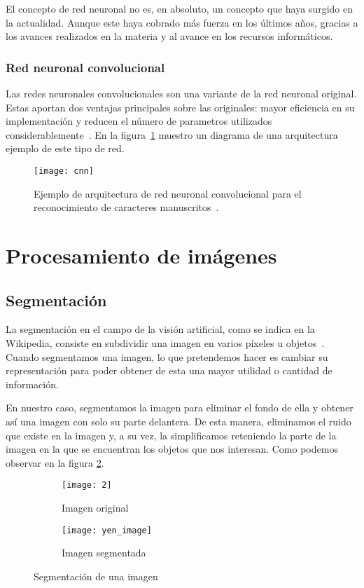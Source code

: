 El concepto de red neuronal no es, en absoluto, un concepto que haya surgido en la actualidad. Aunque este haya cobrado más fuerza en los últimos años, gracias a los avances realizados en la materia y al avance en los recursos informáticos.

\subsubsection{Red neuronal convolucional}

Las redes neuronales convolucionales son una variante de la red neuronal original. Estas aportan dos ventajas principales sobre las originales: mayor eficiencia en su implementación y reducen el número de parametros utilizados considerablemente~\cite{cnn}. En la figura~\ref{fig:3.1.4} muestro un diagrama de una arquitectura ejemplo de este tipo de red.

\begin{figure}
\centering
\texttt{[image: cnn]}
\caption[Ejemplo de arquitectura de red neuronal convolucional]{Ejemplo de arquitectura de red neuronal convolucional para el reconocimiento de caracteres manuscritos~\cite{cnnimage}.}
\label{fig:3.1.4}
\end{figure}

\section{Procesamiento de imágenes}

\subsection{Segmentación}

La segmentación en el campo de la visión artificial, como se indica en la Wikipedia, consiste en subdividir una imagen en varios píxeles u objetos~\cite{wiki:segmentation}. Cuando segmentamos una imagen, lo que pretendemos hacer es cambiar su representación para poder obtener de esta una mayor utilidad o cantidad de información.

En nuestro caso, segmentamos la imagen para eliminar el fondo de ella y obtener así una imagen con solo su parte delantera. De esta manera, eliminamos el ruido que existe en la imagen y, a su vez, la simplificamos reteniendo la parte de la imagen en la que se encuentran los objetos que nos interesan. Como podemos observar en la figura \ref{fig:3.4.0}.

\begin{figure}
	\centering
	\begin{subfigure}[b]{0.4\textwidth}
        \texttt{[image: 2]}
        \caption{Imagen original}
    \end{subfigure}
    \hspace{1em}
    \begin{subfigure}[b]{0.4\textwidth}
        \texttt{[image: yen\_image]}
        \caption{Imagen segmentada}
    \end{subfigure}
    \caption{Segmentación de una imagen}
	\label{fig:3.4.0}
\end{figure}

